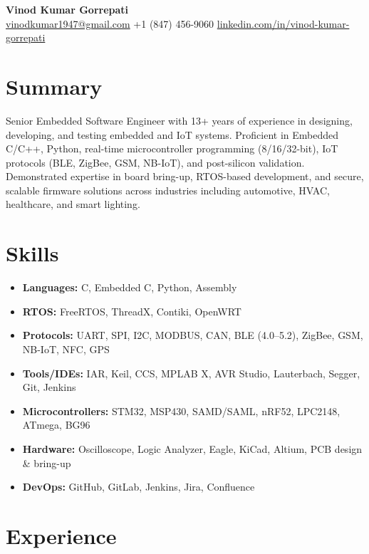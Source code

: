 \documentclass[10pt]{article}
\begin{document}
\begin{center}
    {\LARGE \textbf{Vinod Kumar Gorrepati}} \\
    \href{mailto:vinodkumar1947@gmail.com}{vinodkumar1947@gmail.com} \quad
    +1 (847) 456-9060 \quad
    \href{https://www.linkedin.com/in/vinod-kumar-gorrepati}{linkedin.com/in/vinod-kumar-gorrepati} \\
    \vspace{0.2cm}
\end{center}

\section*{Summary}
Senior Embedded Software Engineer with 13+ years of experience in designing, developing, and testing embedded and IoT systems. Proficient in Embedded C/C++, Python, real-time microcontroller programming (8/16/32-bit), IoT protocols (BLE, ZigBee, GSM, NB-IoT), and post-silicon validation. Demonstrated expertise in board bring-up, RTOS-based development, and secure, scalable firmware solutions across industries including automotive, HVAC, healthcare, and smart lighting.

\section*{Skills}
\begin{itemize}[leftmargin=*]
  \item \textbf{Languages:} C, Embedded C, Python, Assembly
  \item \textbf{RTOS:} FreeRTOS, ThreadX, Contiki, OpenWRT
  \item \textbf{Protocols:} UART, SPI, I2C, MODBUS, CAN, BLE (4.0–5.2), ZigBee, GSM, NB-IoT, NFC, GPS
  \item \textbf{Tools/IDEs:} IAR, Keil, CCS, MPLAB X, AVR Studio, Lauterbach, Segger, Git, Jenkins
  \item \textbf{Microcontrollers:} STM32, MSP430, SAMD/SAML, nRF52, LPC2148, ATmega, BG96
  \item \textbf{Hardware:} Oscilloscope, Logic Analyzer, Eagle, KiCad, Altium, PCB design & bring-up
  \item \textbf{DevOps:} GitHub, GitLab, Jenkins, Jira, Confluence
\end{itemize}

\section*{Experience}
\end{document}
